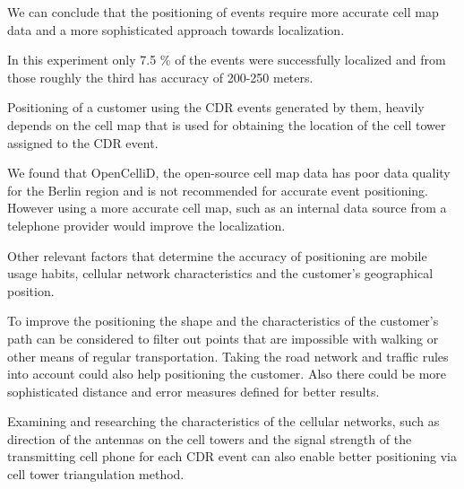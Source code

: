 We can conclude that the positioning of events require more accurate cell map data and a more sophisticated approach towards localization. 

In this experiment only 7.5 \% of the events were successfully localized and from those roughly the third has accuracy of 200-250 meters. 

Positioning of a customer using the CDR events generated by them, heavily depends on the cell map that is used for obtaining the location of the cell tower assigned to the CDR event. 

We found that OpenCelliD, the open-source cell map data has poor data quality for the Berlin region and is not recommended for accurate event positioning. However using a more accurate cell map, such as an internal data source from a telephone provider would improve the localization.

Other relevant factors that determine the accuracy of positioning are mobile usage habits, cellular network characteristics and the customer's geographical position.

To improve the positioning the shape and the characteristics of the customer's path can be considered to filter out points that are impossible with walking or other means of regular transportation. Taking the road network and traffic rules into account could also help positioning the customer. Also there could be more sophisticated distance and error measures defined for better results.

Examining and researching the characteristics of the cellular networks, such as direction of the antennas on the cell towers and the signal strength of the transmitting cell phone for each CDR event can also enable better positioning via cell tower triangulation method. 
